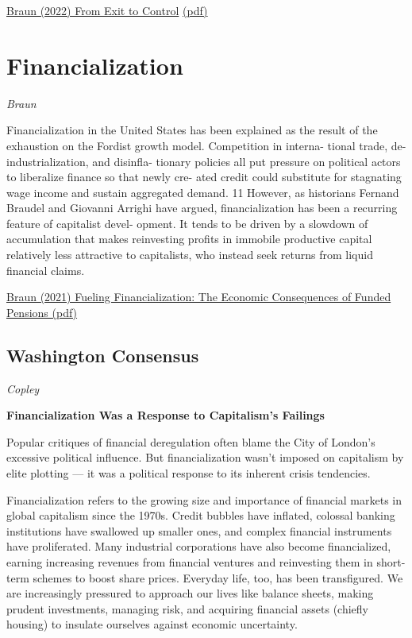 \documentclass[
]{book}
\begin{document}
\href{https://osf.io/preprints/socarxiv/4uesc}{Braun (2022) From Exit to Control}
\href{pdf/Braun_2022_From_exit_to_control.pdf}{(pdf)}

\hypertarget{financialization}{%
\chapter{Financialization}\label{financialization}}

\emph{Braun}

Financialization in the United States has been
explained as the result of the exhaustion on the
Fordist growth model. Competition in interna-
tional trade, de-industrialization, and disinfla-
tionary policies all put pressure on political
actors to liberalize finance so that newly cre-
ated credit could substitute for stagnating wage
income and sustain aggregated demand. 11
However, as historians Fernand Braudel and
Giovanni Arrighi have argued, financialization
has been a recurring feature of capitalist devel-
opment. It tends to be driven by a slowdown of
accumulation that makes reinvesting profits in
immobile productive capital relatively less
attractive to capitalists, who instead seek
returns from liquid financial claims.

\href{pdf/Braun_2021_Fueling_Financialization_Funded_Pensions.pdf}{Braun (2021) Fueling Financialization: The Economic Consequences of Funded Pensions (pdf)}

\hypertarget{washington-consensus}{%
\section{Washington Consensus}\label{washington-consensus}}

\emph{Copley}

\textbf{Financialization Was a Response to Capitalism's Failings}

Popular critiques of financial deregulation often blame the City of London's excessive political influence. But financialization wasn't imposed on capitalism by elite plotting --- it was a political response to its inherent crisis tendencies.

Financialization refers to the growing size and importance of financial markets in global capitalism since the 1970s. Credit bubbles have inflated, colossal banking institutions have swallowed up smaller ones, and complex financial instruments have proliferated. Many industrial corporations have also become financialized, earning increasing revenues from financial ventures and reinvesting them in short-term schemes to boost share prices. Everyday life, too, has been transfigured. We are increasingly pressured to approach our lives like balance sheets, making prudent investments, managing risk, and acquiring financial assets (chiefly housing) to insulate ourselves against economic uncertainty.
\end{document}
